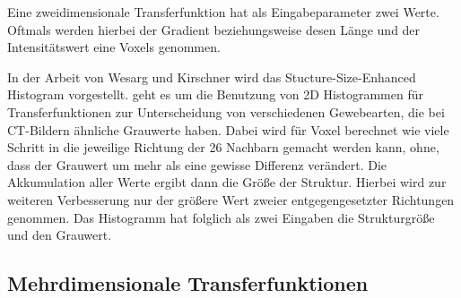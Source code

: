 Eine zweidimensionale Transferfunktion hat als Eingabeparameter zwei Werte. Oftmals werden hierbei der Gradient beziehungsweise desen Länge und der Intensitätswert eine Voxels genommen.

In der Arbeit von Wesarg und Kirschner \cite{wesarg2009structure} \cite{wesarg20102d} wird das Stucture-Size-Enhanced Histogram vorgestellt. geht es um die Benutzung von 2D Histogrammen für Transferfunktionen zur Unterscheidung von verschiedenen Gewebearten, die bei CT-Bildern ähnliche Grauwerte haben.
Dabei wird für Voxel berechnet wie viele Schritt in die jeweilige Richtung der 26 Nachbarn gemacht werden kann, ohne, dass der Grauwert um mehr als eine gewisse Differenz verändert. Die Akkumulation aller Werte ergibt dann die Größe der Struktur. Hierbei wird zur weiteren Verbesserung nur der größere Wert zweier entgegengesetzter Richtungen genommen.
Das Histogramm hat folglich als zwei Eingaben die Strukturgröße und den Grauwert.




\subsection{Mehrdimensionale Transferfunktionen}




